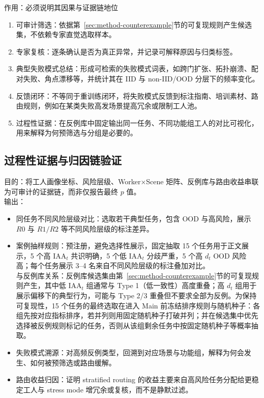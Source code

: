  作用：必须说明其因果与证据链地位
 \begin{enumerate}
     \item 可审计筛选：依据第~\ref{sec:method-counterexample}节的可复现规则产生候选集，不依赖专家直觉选取样本。
     \item 专家复核：逐条确认是否为真正异常，并记录可解释原因与归类标签。
     \item 典型失败模式总结：形成可检索的失败模式词表，如跨门扩张、拓扑崩溃、配对失败、角点漂移等，并统计其在 IID 与 non-IID/OOD 分层下的频率变化。
     \item 反馈闭环：不等同于重训练闭环，将失败模式反馈到标注指南、培训素材、路由规则，例如在某类失败高发场景提高冗余或限制工人池。
     \item 过程性证据：在反例库中固定输出同一任务、不同功能组工人的对比可视化，用来解释为何预筛选与分组是必要的。
 \end{enumerate}

\subsection{过程性证据与归因链验证}\label{sec:report-process-evidence}
目的：将工人画像坐标、风险层级、Worker×Scene 矩阵、反例库与路由收益串联为可审计的证据链，而非仅报告最终 $p$ 值。
\\ 输出：
\begin{itemize}
    \item 同任务不同风险层级对比：选取若干典型任务，包含 OOD 与高风险，展示 $R0$ 与 $R1/R2$ 等不同风险层级的标注差异。
    \item 案例抽样规则：预注册，避免选择性展示，固定抽取 15 个任务用于正文展示，5 个高 $\mathrm{IAA}_{t}$ 共识明确，5 个低 $\mathrm{IAA}_{t}$ 分歧严重，5 个高 $d_{t}$ OOD 风险高；每个任务展示 3--4 名来自不同风险层级的标注叠加对比。
    \\ 与反例库关系：反例库候选集由第~\ref{sec:method-counterexample}节的可复现规则产生，其中低 $\mathrm{IAA}_{t}$ 组通常与 Type 1（低一致性）高度重叠；高 $d_t$ 组用于展示偏移下的典型行为，可能与 Type 2/3 重叠但不要求全部为反例。为保持可复现性，15 个任务的最终选取在进入 Main 前冻结排序规则与随机种子：各组先按对应指标排序，若并列则用固定随机种子打破并列；并在候选集中优先选择被反例规则标记的任务，否则从该组剩余任务中按固定随机种子等概率抽取。
    \item 失败模式溯源：对高频反例类型，回溯到对应场景与功能组，解释为何会发生、如何被预筛选或路由缓解。
    \item 路由收益归因：证明 stratified routing 的收益主要来自高风险任务分配给更稳定工人与 stress mode 增冗余或复核，而不是静默过滤。
\end{itemize}






